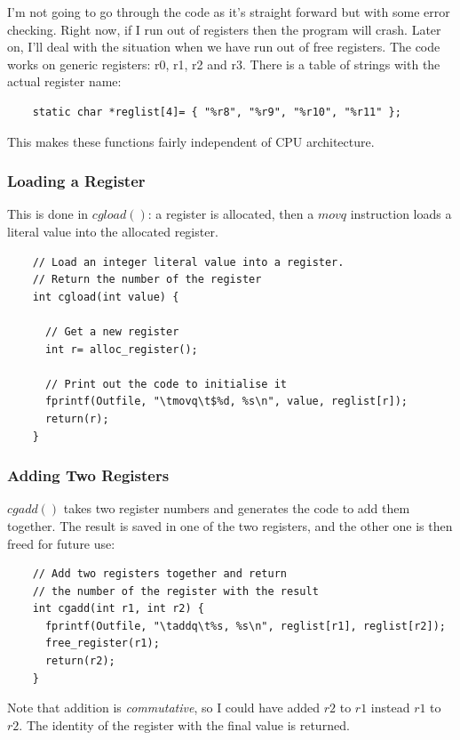 \documentclass[journal, onecolumn, 12pt]{IEEEtran}
\begin{document}
I'm not going to go through the code as it's straight forward but with some error checking. Right now, if I run out of registers then the program will crash. Later on, I'll deal with the situation when we have run out of free registers. The code works on generic registers: r0, r1, r2 and r3. There is a table of strings with the actual register name:

\begin{lstlisting}
    static char *reglist[4]= { "%r8", "%r9", "%r10", "%r11" };
\end{lstlisting}

This makes these functions fairly independent of CPU architecture.

\subsubsection{Loading a Register}

This is done in $cgload()$: a register is allocated, then a $movq$ instruction loads a literal value into the allocated register.

\begin{lstlisting}
    // Load an integer literal value into a register.
    // Return the number of the register
    int cgload(int value) {
    
      // Get a new register
      int r= alloc_register();
    
      // Print out the code to initialise it
      fprintf(Outfile, "\tmovq\t$%d, %s\n", value, reglist[r]);
      return(r);
    }
\end{lstlisting}

\subsubsection{Adding Two Registers}

$cgadd()$ takes two register numbers and generates the code to add them together. The result is saved in one of the two registers, and the other one is then freed for future use:

\begin{lstlisting}
    // Add two registers together and return
    // the number of the register with the result
    int cgadd(int r1, int r2) {
      fprintf(Outfile, "\taddq\t%s, %s\n", reglist[r1], reglist[r2]);
      free_register(r1);
      return(r2);
    }
\end{lstlisting}

Note that addition is \textit{commutative}, so I could have added $r2$ to $r1$ instead $r1$ to $r2$. The identity of the register with the final value is returned.
\end{document}
